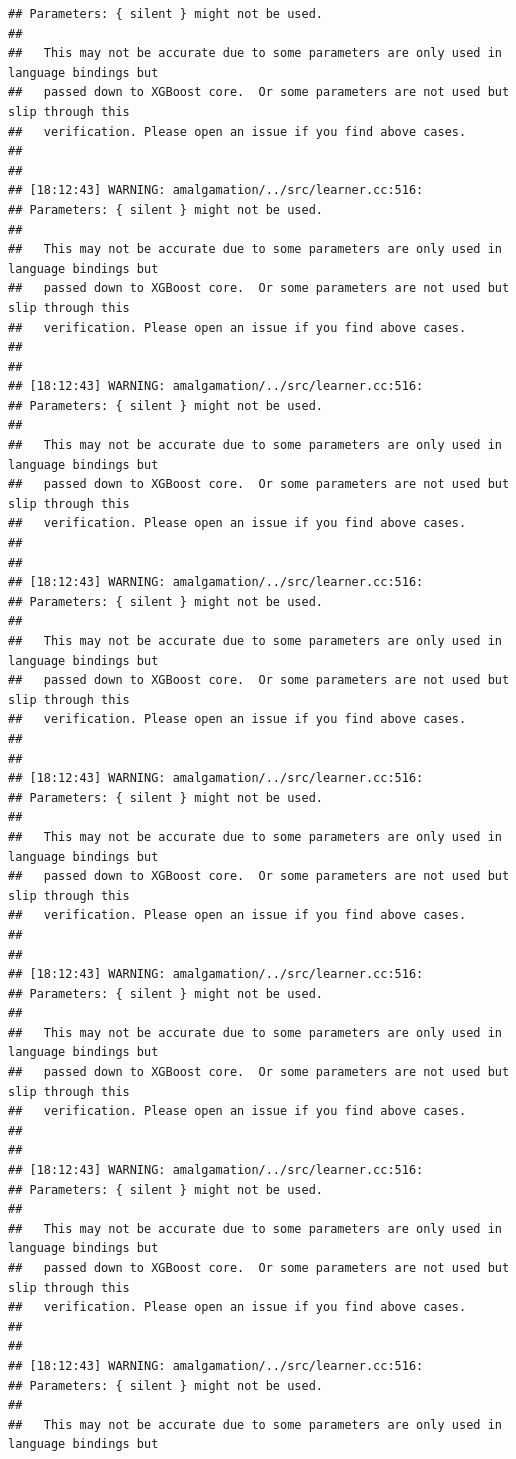 \documentclass[AMS,STIX2COL]{WileyNJD-v2}\usepackage[]{graphicx}\usepackage[]{color}
\makeatletter
\newenvironment{kframe}{%
 \def\at@end@of@kframe{}%
 \ifinner\ifhmode%
  \def\at@end@of@kframe{\end{minipage}}%
  \begin{minipage}{\columnwidth}%
 \fi\fi%
 \def\FrameCommand##1{\hskip\@totalleftmargin \hskip-\fboxsep
 \colorbox{shadecolor}{##1}\hskip-\fboxsep
     \hskip-\linewidth \hskip-\@totalleftmargin \hskip\columnwidth}%
 \MakeFramed {\advance\hsize-\width
   \@totalleftmargin\z@ \linewidth\hsize
   \@setminipage}}%
 {\par\unskip\endMakeFramed%
 \at@end@of@kframe}
\newenvironment{knitrout}{}{} %
\makeatother
\begin{document}
\begin{knitrout}
\begin{kframe}
\begin{verbatim}
## Parameters: { silent } might not be used.
## 
##   This may not be accurate due to some parameters are only used in language bindings but
##   passed down to XGBoost core.  Or some parameters are not used but slip through this
##   verification. Please open an issue if you find above cases.
## 
## 
## [18:12:43] WARNING: amalgamation/../src/learner.cc:516: 
## Parameters: { silent } might not be used.
## 
##   This may not be accurate due to some parameters are only used in language bindings but
##   passed down to XGBoost core.  Or some parameters are not used but slip through this
##   verification. Please open an issue if you find above cases.
## 
## 
## [18:12:43] WARNING: amalgamation/../src/learner.cc:516: 
## Parameters: { silent } might not be used.
## 
##   This may not be accurate due to some parameters are only used in language bindings but
##   passed down to XGBoost core.  Or some parameters are not used but slip through this
##   verification. Please open an issue if you find above cases.
## 
## 
## [18:12:43] WARNING: amalgamation/../src/learner.cc:516: 
## Parameters: { silent } might not be used.
## 
##   This may not be accurate due to some parameters are only used in language bindings but
##   passed down to XGBoost core.  Or some parameters are not used but slip through this
##   verification. Please open an issue if you find above cases.
## 
## 
## [18:12:43] WARNING: amalgamation/../src/learner.cc:516: 
## Parameters: { silent } might not be used.
## 
##   This may not be accurate due to some parameters are only used in language bindings but
##   passed down to XGBoost core.  Or some parameters are not used but slip through this
##   verification. Please open an issue if you find above cases.
## 
## 
## [18:12:43] WARNING: amalgamation/../src/learner.cc:516: 
## Parameters: { silent } might not be used.
## 
##   This may not be accurate due to some parameters are only used in language bindings but
##   passed down to XGBoost core.  Or some parameters are not used but slip through this
##   verification. Please open an issue if you find above cases.
## 
## 
## [18:12:43] WARNING: amalgamation/../src/learner.cc:516: 
## Parameters: { silent } might not be used.
## 
##   This may not be accurate due to some parameters are only used in language bindings but
##   passed down to XGBoost core.  Or some parameters are not used but slip through this
##   verification. Please open an issue if you find above cases.
## 
## 
## [18:12:43] WARNING: amalgamation/../src/learner.cc:516: 
## Parameters: { silent } might not be used.
## 
##   This may not be accurate due to some parameters are only used in language bindings but

\end{verbatim}
\end{kframe}
\end{knitrout}
\end{document}
